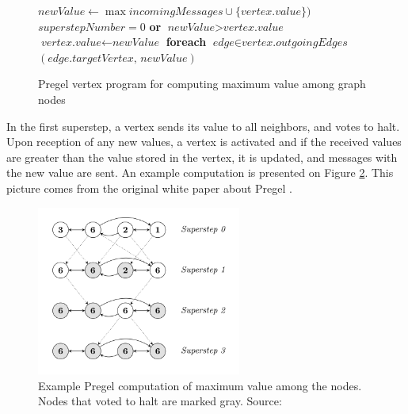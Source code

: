 \begin{figure}[!htbp]

\begin{codebox}
  \li $\textit{newValue} \leftarrow \max\textit{incomingMessages} \cup \{\textit{vertex.value}\})$
  \li \If  $superstepNumber = 0$ \textbf{or} $\textit{newValue} > \textit{vertex.value}$
  \li \Then
   $\textit{vertex.value} \leftarrow \textit{newValue}$
   \li \textbf{foreach} $\textit{edge} \in \textit{vertex.outgoingEdges}$ \Then
  \li {}$(\textit{edge.targetVertex, newValue})$
  	  \End
  \li \Else
  \li {}
      \End
\end{codebox}
\caption{Pregel vertex program for computing maximum value among graph nodes}\label{psc:pregelmaxval}
\end{figure}

In the first superstep, a vertex sends its value to all neighbors, and votes to halt. Upon reception of any new values, a vertex is activated and if the received values are greater than the value stored in the vertex, it is updated, and messages with the new value are sent. An example computation is presented on Figure \ref{img:pregelmaxval}. This picture comes from the original white paper about Pregel \cite{pregel}.

\begin{figure}[!ht]
\begin{center}
\includegraphics[width=0.6\textwidth]{PregelMaxVal.png}
\caption{Example Pregel computation of maximum value among the nodes. Nodes that voted to halt are marked gray. Source: \cite{pregel}}\label{img:pregelmaxval}
\end{center}
\end{figure}

